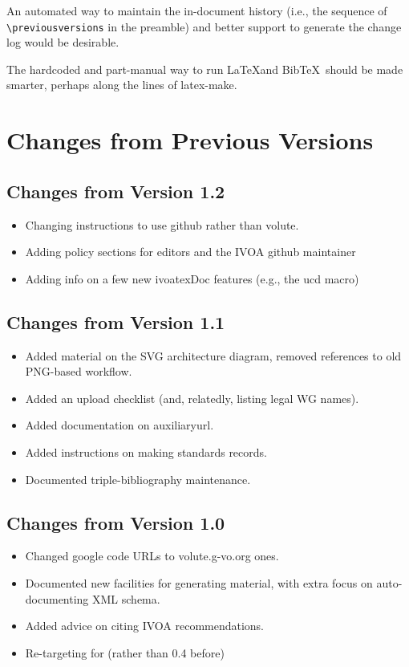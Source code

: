 \documentclass[11pt,a4paper]{ivoa}
\newcommand{\BibTeX}{BibTeX}
\begin{document}
An automated way to maintain the in-document history (i.e., the sequence
of \verb|\previousversions| in the preamble) and better support to
generate the change log would be desirable.

The hardcoded and part-manual way to run \LaTeX and \BibTeX~should be
made smarter, perhaps along the lines of latex-make.

\appendix
\section{Changes from Previous Versions}

\subsection{Changes from Version 1.2}

\begin{itemize}
\item Changing instructions to use github rather than volute.
\item Adding policy sections for editors and the IVOA github maintainer
\item Adding info on a few new ivoatexDoc features (e.g., the ucd macro)
\end{itemize}

\subsection{Changes from Version 1.1}

\begin{itemize}
\item Added material on the SVG architecture diagram, removed references
to old PNG-based workflow.
\item Added an upload checklist (and, relatedly, listing legal WG names).
\item Added documentation on auxiliaryurl.
\item Added instructions on making standards records.
\item Documented triple-bibliography maintenance.
\end{itemize}

\subsection{Changes from Version 1.0}
\begin{itemize}
\item Changed google code URLs to volute.g-vo.org ones.
\item Documented new facilities for generating material, with extra
focus on auto-documenting XML schema.
\item Added advice on citing IVOA recommendations.
\item Re-targeting for  (rather than 0.4 before)
\end{itemize}



\end{document}

